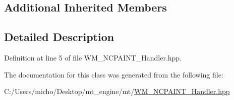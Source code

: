 \subsection*{Additional Inherited Members}


\subsection{Detailed Description}


Definition at line 5 of file W\+M\+\_\+\+N\+C\+P\+A\+I\+N\+T\+\_\+\+Handler.\+hpp.



The documentation for this class was generated from the following file\+:\begin{DoxyCompactItemize}
\item 
C\+:/\+Users/micho/\+Desktop/mt\+\_\+engine/mt/\hyperlink{_w_m___n_c_p_a_i_n_t___handler_8hpp}{W\+M\+\_\+\+N\+C\+P\+A\+I\+N\+T\+\_\+\+Handler.\+hpp}\end{DoxyCompactItemize}
